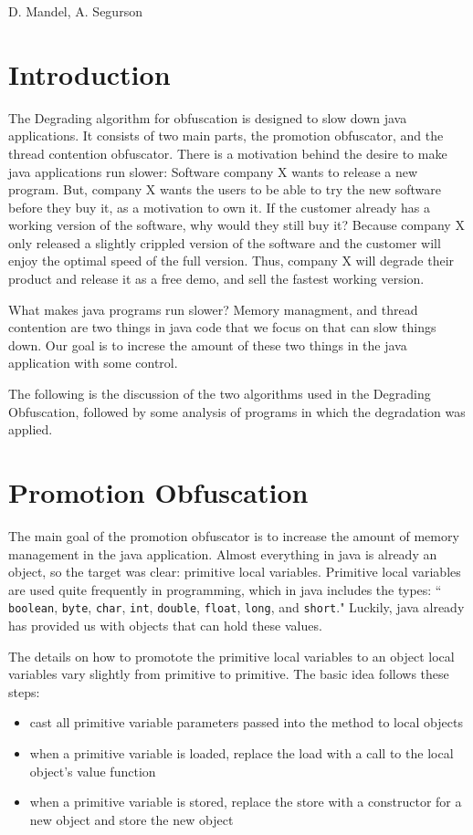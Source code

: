 %
          {D. Mandel, A. Segurson}


\section{Introduction}
The Degrading algorithm for obfuscation is designed to slow down java
applications. It consists of two main parts, the promotion obfuscator,
and the thread contention obfuscator. There is a motivation behind the
desire to make java applications run slower: Software company X wants to
release a new program. But, company X wants the users to be able to
try the new software before they buy it, as a motivation to own it.
If the customer already has a working version of the software, why
would they still buy it? Because company X only released a slightly
crippled version of the software and the customer will enjoy  
the optimal speed of the full version. Thus, company X will degrade
their product and release it as a free demo, and sell the fastest
working version.

What makes java programs run slower? Memory managment, and thread 
contention are two things in java code that we focus on that 
can slow things down.
Our goal is to increse the amount of these two things in the java
application with some control.

The following is the discussion of the two algorithms used in the 
Degrading Obfuscation, followed by some analysis of programs in which 
the degradation was applied.

\section{Promotion Obfuscation}
The main goal of the promotion obfuscator is to increase the amount
of memory management in the java application. Almost everything in
java is already an object, so the target was clear: primitive local
variables. Primitive local variables are used quite frequently in
programming, which in java includes the types: ``\texttt{
boolean}, \texttt{byte}, \texttt{char}, \texttt{int},
\texttt{double}, \texttt{float}, \texttt{long}, and \texttt{short}."
Luckily, java already has provided us with objects that can hold these
values. 

The details on how to promotote the primitive local variables to an
object local variables 
vary slightly from primitive to primitive. The basic idea follows
these steps:
\begin{itemize}
  \item cast all primitive variable parameters passed into the method to
    local objects 
  \item when a primitive variable is loaded, replace the load with
    a call to the local object's value function
  \item when a primitive variable is stored, replace the store with
    a constructor for a new object and store the new object
\end{itemize}

